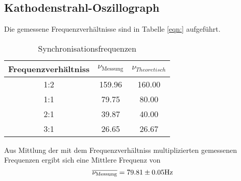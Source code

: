 \subsection{Kathodenstrahl-Oszillograph}
Die gemessene Frequenzverhältnisse sind in Tabelle \ref{eqn:} aufgeführt.
\begin{table}
  \centering
  \begin{tabular}{c c c}
    \toprule
    Frequenzverhältniss & $\nu_\text{Messung}$ & $\nu_{Theoretisch}$ \\
    \midrule
    1:2	& 159.96& 160.00\\
    1:1	& 79.75 & 80.00	\\
    2:1	& 39.87 & 40.00	\\
    3:1	& 26.65 & 26.67	\\
  \end{tabular}
  \caption{Synchronisationsfrequenzen}
  \label{tab:sync}
\end{table}
Aus Mittlung der mit dem Frequenzverhältniss multiplizierten gemessenen Frequenzen ergibt sich eine Mittlere Frequenz von 
\begin{equation}
  \overline{\nu_\text{Messung}} = \num{79.81 +- 0.05} \text{Hz}
  \label{eqn:numess}
\end{equation}
